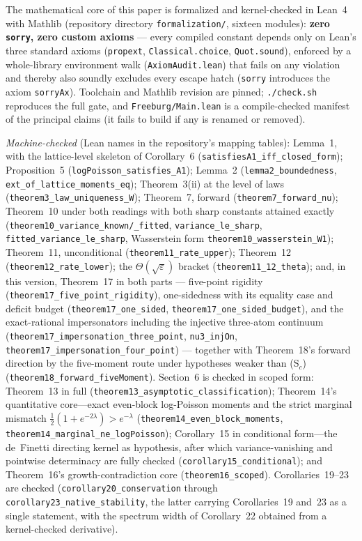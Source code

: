 \documentclass[pdflatex,sn-mathphys-num]{sn-jnl}
\theoremstyle{thmstyleone}
\theoremstyle{thmstyletwo}
\theoremstyle{thmstylethree}
\begin{document}
The mathematical core of this paper is formalized and kernel-checked in
Lean~4 with Mathlib (repository directory \texttt{formalization/},
sixteen modules): \textbf{zero \texttt{sorry}, zero custom axioms} --- every
compiled constant depends only on Lean's three standard axioms
(\texttt{propext}, \texttt{Classical.choice}, \texttt{Quot.sound}),
enforced by a whole-library environment walk
(\texttt{AxiomAudit.lean}) that fails on any violation and thereby also
soundly excludes every escape hatch (\texttt{sorry} introduces the
axiom \texttt{sorryAx}).  Toolchain and Mathlib revision are pinned;
\texttt{./check.sh} reproduces the full gate, and
\texttt{Freeburg/Main.lean} is a compile-checked manifest of the
principal claims (it fails to build if any is renamed or removed).

\emph{Machine-checked} (Lean names in the repository's mapping tables):
Lemma~1, with the lattice-level skeleton of Corollary~6
(\texttt{satisfiesA1\_iff\_closed\_form});
Proposition~5 (\texttt{logPoisson\_satisfies\_A1}); Lemma~2
(\texttt{lemma2\_boundedness}, \texttt{ext\_of\_lattice\_moments\_eq});
Theorem~3(ii) at the level of laws
(\texttt{theorem3\_law\_uniqueness\_W}); Theorem~7, forward
(\texttt{theorem7\_forward\_nu}); Theorem~10 under both readings with
both sharp constants attained exactly
(\texttt{theorem10\_variance\_known/\_fitted},
\texttt{variance\_le\_sharp}, \texttt{fitted\_variance\_le\_sharp},
Wasserstein form \texttt{theorem10\_wasserstein\_W1}); Theorem~11,
unconditional (\texttt{theorem11\_rate\_upper}); Theorem~12
(\texttt{theorem12\_rate\_lower}); the $\Theta(\sqrt\varepsilon)$
bracket (\texttt{theorem11\_12\_theta}); and, in this version,
Theorem~17 in both parts --- five-point rigidity
(\texttt{theorem17\_five\_point\_rigidity}), one-sidedness with its
equality case and deficit budget (\texttt{theorem17\_one\_sided},
\texttt{theorem17\_one\_sided\_budget}), and the exact-rational
impersonators including the injective three-atom continuum
(\texttt{theorem17\_impersonation\_three\_point}, \texttt{nu3\_injOn},
\texttt{theorem17\_impersonation\_four\_point}) --- together with
Theorem~18's forward direction by the five-moment route under
hypotheses weaker than (S$_c$)
(\texttt{theorem18\_forward\_fiveMoment}).  Section~6 is checked in
scoped form: Theorem~13 in full
(\texttt{theorem13\_asymptotic\_classification}); Theorem~14's
quantitative core---exact even-block log-Poisson moments and the
strict marginal mismatch $\tfrac12(1+e^{-2\lambda}) > e^{-\lambda}$
(\texttt{theorem14\_even\_block\_moments},
\texttt{theorem14\_marginal\_ne\_logPoisson}); Corollary~15 in
conditional form---the de~Finetti directing kernel as hypothesis,
after which variance-vanishing and pointwise determinacy are fully
checked (\texttt{corollary15\_conditional}); and Theorem~16's
growth-contradiction core (\texttt{theorem16\_scoped}).
Corollaries~19--23 are checked
(\texttt{corollary20\_conservation} through
\texttt{corollary23\_native\_stability}, the latter carrying
Corollaries~19 and~23 as a single statement, with the spectrum width
of Corollary~22 obtained from a kernel-checked derivative).
\end{document}
